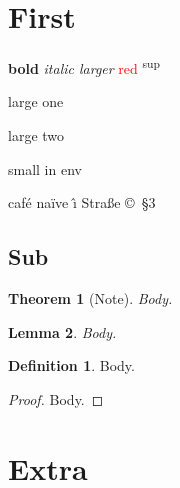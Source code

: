 \documentclass{article}
\newtheorem{theorem}{Theorem}[section]
\newtheorem{lemma}[theorem]{Lemma}
\theoremstyle{definition}
\newtheorem{definition}{Definition}
\begin{document}
\tableofcontents
\section{First}
{\bf bold} {\it italic \large larger} \textcolor{red}{red} \textsuperscript{sup}

\large

large one

large two

\begin{center}
\small small in env
\end{center}

caf\'e na\"ive \^\i{} Stra\ss{}e \copyright\ \S 3

\subsection{Sub}
\begin{theorem}[Note]
Body.
\end{theorem}
\begin{lemma}Body.\end{lemma}
\begin{definition}Body.\end{definition}
\begin{proof}Body.\end{proof}

\appendix
\section{Extra}
\end{document}
